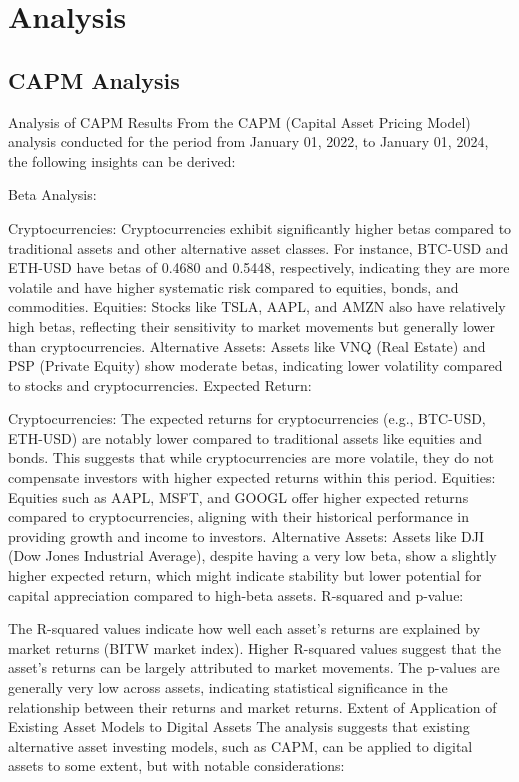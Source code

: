 \section{Analysis}
\subsection{CAPM Analysis}

Analysis of CAPM Results
From the CAPM (Capital Asset Pricing Model) analysis conducted for the period from January 01, 2022, to January 01, 2024, the following insights can be derived:

Beta Analysis:

Cryptocurrencies: Cryptocurrencies exhibit significantly higher betas compared to traditional assets and other alternative asset classes. For instance, BTC-USD and ETH-USD have betas of 0.4680 and 0.5448, respectively, indicating they are more volatile and have higher systematic risk compared to equities, bonds, and commodities.
Equities: Stocks like TSLA, AAPL, and AMZN also have relatively high betas, reflecting their sensitivity to market movements but generally lower than cryptocurrencies.
Alternative Assets: Assets like VNQ (Real Estate) and PSP (Private Equity) show moderate betas, indicating lower volatility compared to stocks and cryptocurrencies.
Expected Return:

Cryptocurrencies: The expected returns for cryptocurrencies (e.g., BTC-USD, ETH-USD) are notably lower compared to traditional assets like equities and bonds. This suggests that while cryptocurrencies are more volatile, they do not compensate investors with higher expected returns within this period.
Equities: Equities such as AAPL, MSFT, and GOOGL offer higher expected returns compared to cryptocurrencies, aligning with their historical performance in providing growth and income to investors.
Alternative Assets: Assets like DJI (Dow Jones Industrial Average), despite having a very low beta, show a slightly higher expected return, which might indicate stability but lower potential for capital appreciation compared to high-beta assets.
R-squared and p-value:

The R-squared values indicate how well each asset's returns are explained by market returns (BITW market index). Higher R-squared values suggest that the asset's returns can be largely attributed to market movements.
The p-values are generally very low across assets, indicating statistical significance in the relationship between their returns and market returns.
Extent of Application of Existing Asset Models to Digital Assets
The analysis suggests that existing alternative asset investing models, such as CAPM, can be applied to digital assets to some extent, but with notable considerations:

